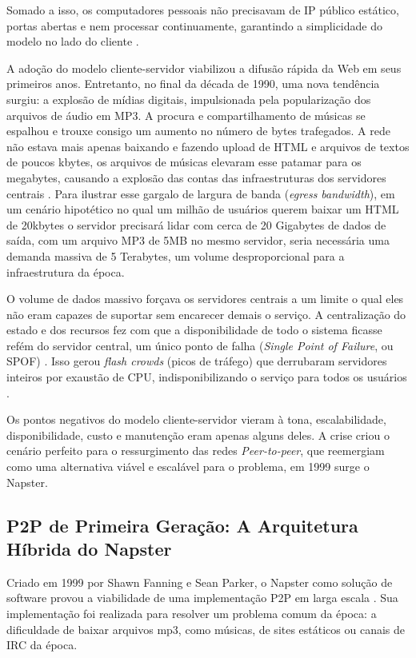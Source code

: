 Somado a isso, os computadores pessoais não precisavam de IP público
estático, portas abertas e nem processar continuamente, garantindo a
simplicidade do modelo no lado do cliente \cite{saltzer1984}.

A adoção do modelo cliente-servidor viabilizou a difusão rápida da Web em
seus primeiros anos. Entretanto, no final da década de 1990, uma nova
tendência surgiu: a explosão de mídias digitais, impulsionada pela
popularização dos arquivos de áudio em MP3. A procura e compartilhamento de
músicas se espalhou e trouxe consigo um aumento no número de bytes
trafegados. A rede não estava mais apenas baixando e fazendo upload de HTML
e arquivos de textos de poucos kbytes, os arquivos de músicas elevaram esse
patamar para os megabytes, causando a explosão das contas das
infraestruturas dos servidores centrais \cite{saroiu2002}. Para ilustrar
esse gargalo de largura de banda (\textit{egress bandwidth}), em um cenário
hipotético no qual um milhão de usuários querem baixar um HTML de 20kbytes
o servidor precisará lidar com cerca de 20 Gigabytes de dados de saída, com
um arquivo MP3 de 5MB no mesmo servidor, seria necessária uma demanda
massiva de 5 Terabytes, um volume desproporcional para a infraestrutura da
época.

O volume de dados massivo forçava os servidores centrais a um limite o
qual eles não eram capazes de suportar sem encarecer demais o serviço. A
centralização do estado e dos recursos fez com que a disponibilidade de
todo o sistema ficasse refém do servidor central, um único ponto de falha
(\textit{Single Point of Failure}, ou SPOF) \cite{tanenbaumvansteen2007}. Isso gerou
\textit{flash crowds} (picos de tráfego) que derrubaram servidores inteiros por
exaustão de CPU, indisponibilizando o serviço para todos os usuários
\cite{padmanabhan2002}.

Os pontos negativos do modelo cliente-servidor vieram à tona, escalabilidade,
disponibilidade, custo e manutenção eram apenas alguns deles. A crise criou
o cenário perfeito para o ressurgimento das redes \textit{Peer-to-peer}, que
reemergiam como uma alternativa viável e escalável para o problema, em 1999
surge o Napster.

\subsection{P2P de Primeira Geração: A Arquitetura Híbrida do Napster}

Criado em 1999 por Shawn Fanning e Sean Parker, o Napster como solução de
software provou a viabilidade de uma implementação P2P em larga escala
\cite{saroiu2002}. Sua implementação foi realizada para resolver um
problema comum da época: a dificuldade de baixar arquivos mp3, como
músicas, de sites estáticos ou canais de IRC da época.

